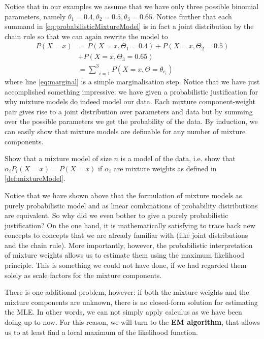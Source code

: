 Notice that in our examples we assume that we have only three possible binomial parameters, namely $ \theta_{1} = 0.4, \theta_{2} = 0.5, \theta_{3} = 0.65 $. 
Notice further that each summand
in \eqref{eq:probabilisticMixtureModel} is in fact a joint distribution by the chain rule so that we can again rewrite the model to
\begin{align}
P(X=x) &= P(X=x,\Theta_{1}=0.4) + P(X=x,\Theta_{2}=0.5) \\
&+ P(X=x,\Theta_{3}=0.65) \nonumber \\
&= \underset{i=1}{\overset{3}{{\sum}}} P(X=x,\Theta=\theta_{c_{i}}) \label{eq:marginal}
\end{align}
where line \eqref{eq:marginal} is a simple marginalisation step. Notice that we have just accomplished something impressive: we have given a probabilistic justification
for why mixture models do indeed model our data. Each mixture component-weight pair gives rise to a joint distribution over parameters and data but by summing over the 
possible parameters we get the probability of the data. By induction, we can easily show that mixture models are definable for any number of mixture components.

\begin{Exercise}
Show that a mixture model of size $ n $ is a model of the data, i.e. show that $  \alpha_{i}P_{i}(X=x) = P(X=x) $ if $ \alpha_{i} $ are mixture weights as 
defined in \ref{def:mixtureModel}.
\end{Exercise}

Notice that we have shown above that the formulation of mixture models as purely probabilistic model and as linear combinations of probability distributions are
equivalent. So why did we even bother to give a purely probabilistic justification? On the one hand, it is mathematically satisfying to trace back new concepts
to concepts that we are already familiar with (like joint distributions and the chain rule). More importantly, however, the probabilistic interpretation of mixture
weights allows us to estimate them using the maximum likelihood principle. This is something we could not have done, if we had regarded them solely as scale factors
for the mixture components. 

There is one additional problem, however: if both the mixture weights and the mixture components are unknown, there is no closed-form solution for estimating the
MLE. In other words, we can not simply apply calculus as we have been doing up to now. For this reason, we will turn to the \textbf{EM algorithm}, that allows
us to at least find a local maximum of the likelihood function.



